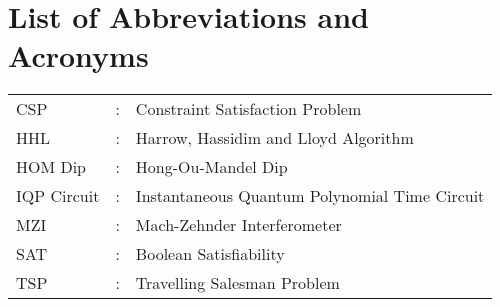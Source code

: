 \chapter*{List of Abbreviations and Acronyms}

\begin{tabular}{lcl}
CSP                 &:     & Constraint Satisfaction Problem\\
HHL &: & Harrow, Hassidim and Lloyd Algorithm\\
HOM Dip &: & Hong-Ou-Mandel Dip\\
IQP Circuit &: & Instantaneous Quantum Polynomial Time Circuit\\
MZI &: & Mach-Zehnder Interferometer\\
SAT                 &:     & Boolean Satisfiability\\
TSP                 &:     & Travelling Salesman Problem\\
\end{tabular}
